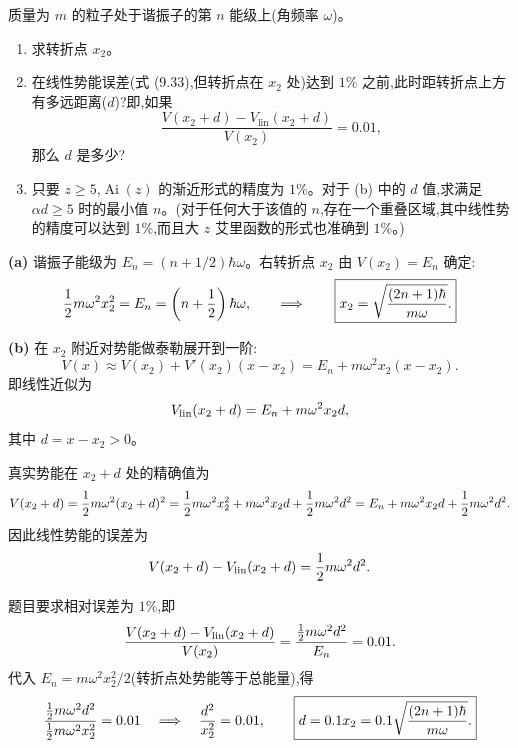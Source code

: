 \begin{question}
质量为 $m$ 的粒子处于谐振子的第 $n$ 能级上(角频率 $\omega$)。
\begin{enumerate}
\item 求转折点 $x_2$。
\item 在线性势能误差(式 (9.33),但转折点在 $x_2$ 处)达到 $1\%$ 之前,此时距转折点上方有多远距离($d$)?即,如果
\[
\frac{V(x_2+d)-V_{\mathrm{lin}}(x_2+d)}{V(x_2)}=0.01,
\]
那么 $d$ 是多少?
\item 只要 $z\ge5$,$\operatorname{Ai}(z)$ 的渐近形式的精度为 $1\%$。对于 (b) 中的 $d$ 值,求满足 $\alpha d\ge5$ 时的最小值 $n$。(对于任何大于该值的 $n$,存在一个重叠区域,其中线性势的精度可以达到 $1\%$,而且大 $z$ 艾里函数的形式也准确到 $1\%$。)
\end{enumerate}

\par\smallskip
{}

\begin{solution}
\textbf{(a)} 谐振子能级为 $E_n=(n+1/2)\hbar\omega$。右转折点 $x_2$ 由 $V(x_2)=E_n$ 确定:
\[
{1\over2}m\omega^2x_2^2=E_n=\left(n+{1\over2}\right)\hbar\omega,
\qquad\Longrightarrow\qquad
\boxed{x_2=\sqrt{{(2n+1)\hbar\over m\omega}}.}
\]

\textbf{(b)} 在 $x_2$ 附近对势能做泰勒展开到一阶:
\[
V(x)\approx V(x_2)+V'(x_2)(x-x_2)=E_n+m\omega^2x_2(x-x_2).
\]
即线性近似为
\[
V_{\rm lin}(x_2+d)=E_n+m\omega^2x_2d,
\]
其中 $d=x-x_2>0$。

真实势能在 $x_2+d$ 处的精确值为
\[
V(x_2+d)={1\over2}m\omega^2(x_2+d)^2
={1\over2}m\omega^2x_2^2+m\omega^2x_2d+{1\over2}m\omega^2d^2
=E_n+m\omega^2x_2d+{1\over2}m\omega^2d^2.
\]
因此线性势能的误差为
\[
V(x_2+d)-V_{\rm lin}(x_2+d)={1\over2}m\omega^2d^2.
\]

题目要求相对误差为 $1\%$,即
\[
{V(x_2+d)-V_{\rm lin}(x_2+d)\over V(x_2)}
={{1\over2}m\omega^2d^2\over E_n}=0.01.
\]
代入 $E_n=m\omega^2x_2^2/2$(转折点处势能等于总能量),得
\[
{{1\over2}m\omega^2d^2\over{1\over2}m\omega^2x_2^2}=0.01
\quad\Longrightarrow\quad
{d^2\over x_2^2}=0.01,
\qquad
\boxed{d=0.1x_2=0.1\sqrt{{(2n+1)\hbar\over m\omega}}.}
\]


\end{solution}
\end{question}
